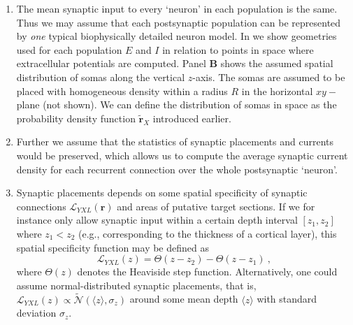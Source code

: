 \begin{enumerate}
\item The mean synaptic input to every `neuron' in each population is the same.
Thus we may assume that each postsynaptic population can be represented by \emph{one} typical biophysically detailed neuron model. 
In  we show geometries used for each population $E$ and $I$ in relation to points in space where extracellular potentials are computed. 
Panel {\bf B} shows the assumed spatial distribution of somas along the vertical $z$-axis. 
The somas are assumed to be placed with homogeneous density within a radius $R$ in the horizontal $xy-$plane (not shown).
We can define the distribution of somas in space as the probability density function $\widetilde{\mathbf{r}}_X$ introduced earlier. 
 
\item Further we assume that the statistics of synaptic placements and currents would be preserved,
which allows us to compute the average synaptic current density for each recurrent connection over the whole postsynaptic `neuron'.  

\item Synaptic placements depends on some spatial specificity of synaptic connections \( \mathcal{L}_{YXL}(\mathbf{r}) \) and areas of putative target sections.
If we for instance only allow synaptic input within a certain depth interval $[z_1, z_2]$ where $z_1 < z_2$ (e.g., corresponding to the thickness of a cortical layer),
this spatial specificity function may be defined as
\begin{equation}
\mathcal{L}_{YXL}(z) = \Theta(z - z_2) - \Theta(z - z_1) ~,
\end{equation}
where $\Theta(z)$ denotes the Heaviside step function. 
Alternatively, one could assume normal-distributed synaptic placements, that is, 
$\mathcal{L}_{YXL}(z)\propto \mathcal{\widetilde{N}}(\langle z \rangle, \sigma_z)$ 
around some mean depth $\langle z \rangle$ with standard deviation $\sigma_z$.


\end{enumerate}
